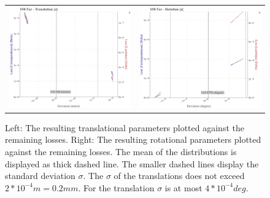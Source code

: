\begin{figure}[!ht]
\begin{tabular}{cc}
    \includegraphics[width=0.45 \linewidth]{diagrams/calibration/s50_s_far/parameters.csv/Translation[z]_vs_Loss[Correspondences]_vs_Loss[Lambdas]_cluster_All.png} &
    \includegraphics[width=0.45 \linewidth]{diagrams/calibration/s50_s_far/parameters.csv/Rotation[z]_vs_Loss[Correspondences]_vs_Loss[Lambdas]_cluster_All.png} \\
\end{tabular}
\caption{
  Left: The resulting translational parameters plotted against the remaining losses. 
  Right: The resulting rotational parameters plotted against the remaining losses.
  The mean of the distributions is displayed as thick dashed line. The smaller dashed lines display the standard deviation $\sigma$.
  The $\sigma$ of the translations does not exceed $2 * 10^{-4} m = 0.2 mm$.
  For the translation $\sigma$ is at most $4 * 10^{-4} deg$.
  }
\label{fig:static_calibration_algorithmic_error_s50_s_far}
\end{figure}

